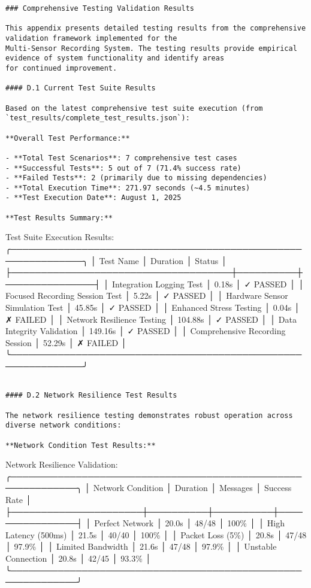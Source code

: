 \documentclass[11pt,a4paper]{report}
\begin{document}
{{\begin{verbatim}
### Comprehensive Testing Validation Results

This appendix presents detailed testing results from the comprehensive validation framework implemented for the
Multi-Sensor Recording System. The testing results provide empirical evidence of system functionality and identify areas
for continued improvement.

#### D.1 Current Test Suite Results

Based on the latest comprehensive test suite execution (from `test_results/complete_test_results.json`):

**Overall Test Performance:**

- **Total Test Scenarios**: 7 comprehensive test cases
- **Successful Tests**: 5 out of 7 (71.4% success rate)
- **Failed Tests**: 2 (primarily due to missing dependencies)
- **Total Execution Time**: 271.97 seconds (~4.5 minutes)
- **Test Execution Date**: August 1, 2025

**Test Results Summary:**

\end{verbatim}
Test Suite Execution Results:
╭──────────────────────────────────────────────────────────────╮
│ Test Name                           │ Duration │ Status        │
├─────────────────────────────────────┼──────────┼───────────────┤
│ Integration Logging Test            │ 0.18s    │ ✓ PASSED     │
│ Focused Recording Session Test      │ 5.22s    │ ✓ PASSED     │
│ Hardware Sensor Simulation Test    │ 45.85s   │ ✓ PASSED     │
│ Enhanced Stress Testing             │ 0.04s    │ ✗ FAILED     │
│ Network Resilience Testing          │ 104.88s  │ ✓ PASSED     │
│ Data Integrity Validation          │ 149.16s  │ ✓ PASSED     │
│ Comprehensive Recording Session     │ 52.29s   │ ✗ FAILED     │
╰──────────────────────────────────────────────────────────────╯
\begin{verbatim}

#### D.2 Network Resilience Test Results

The network resilience testing demonstrates robust operation across diverse network conditions:

**Network Condition Test Results:**

\end{verbatim}
Network Resilience Validation:
╭─────────────────────────────────────────────────────────────╮
│ Network Condition    │ Duration │ Messages │ Success Rate   │
├──────────────────────┼──────────┼──────────┼────────────────┤
│ Perfect Network      │ 20.0s    │ 48/48    │ 100\%          │
│ High Latency (500ms) │ 21.5s    │ 40/40    │ 100\%          │
│ Packet Loss (5\%)     │ 20.8s    │ 47/48    │ 97.9\%         │
│ Limited Bandwidth    │ 21.6s    │ 47/48    │ 97.9\%         │
│ Unstable Connection  │ 20.8s    │ 42/45    │ 93.3\%         │
╰─────────────────────────────────────────────────────────────╯
\begin{verbatim}


\end{verbatim}}}
\end{document}
